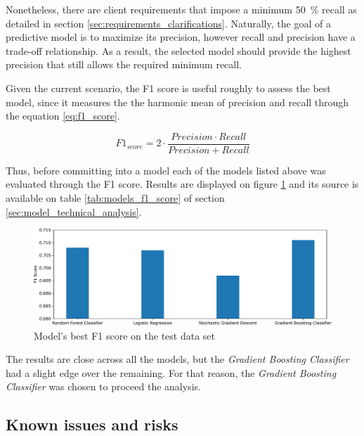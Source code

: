 \documentclass[a4paper,11pt]{article}
\begin{document}
Nonetheless, there are client requirements that impose a minimum \SI{50}{\percent} recall as detailed in section \ref{sec:requirements_clarifications}. Naturally, the goal of a predictive model is to maximize its precision, however recall and precision have a trade-off relationship. As a result, the selected model should provide the highest precision that still allows the required minimum recall.

Given the current scenario, the F1 score is useful roughly to assess the best model, since it measures the the harmonic mean of precision and recall through the equation \ref{eq:f1_score}. 

\begin{equation}
    \label{eq:f1_score}
    F1_{score} = 2 \cdot \frac{Precision \cdot Recall}{Precision + Recall}
\end{equation}

Thus, before committing into a model each of the models listed above was evaluated through the F1 score. Results are displayed on figure \ref{fig:models_f1_score} and its source is available on table \ref{tab:models_f1_score} of section \ref{sec:model_technical_analysis}.

\begin{figure}[!htb]
	\centering
	\includegraphics[width=1\textwidth]{images/models_f1_score.pdf}
	\caption{Model's best F1 score on the test data set}
	\label{fig:models_f1_score}
\end{figure}

The results are close across all the models, but the \textit{Gradient Boosting Classifier} had a slight edge over the remaining. 
For that reason, the \textit{Gradient Boosting Classifier} was chosen to proceed the analysis.

\subsection{Known issues and risks}
\end{document}
